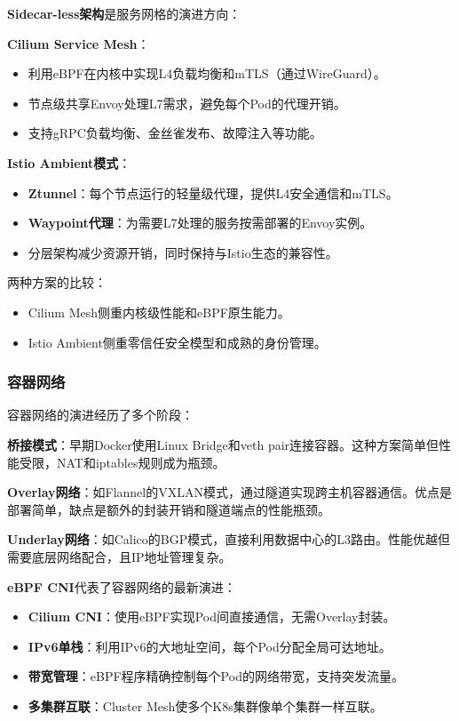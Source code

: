\textbf{Sidecar-less架构}是服务网格的演进方向：

\textbf{Cilium Service Mesh}：
\begin{itemize}
    \item 利用eBPF在内核中实现L4负载均衡和mTLS（通过WireGuard）。
    \item 节点级共享Envoy处理L7需求，避免每个Pod的代理开销。
    \item 支持gRPC负载均衡、金丝雀发布、故障注入等功能。
\end{itemize}

\textbf{Istio Ambient模式}：
\begin{itemize}
    \item \textbf{Ztunnel}：每个节点运行的轻量级代理，提供L4安全通信和mTLS。
    \item \textbf{Waypoint代理}：为需要L7处理的服务按需部署的Envoy实例。
    \item 分层架构减少资源开销，同时保持与Istio生态的兼容性。
\end{itemize}

两种方案的比较：
\begin{itemize}
    \item Cilium Mesh侧重内核级性能和eBPF原生能力。
    \item Istio Ambient侧重零信任安全模型和成熟的身份管理。
\end{itemize}

\subsubsection{容器网络}

容器网络的演进经历了多个阶段：

\textbf{桥接模式}：早期Docker使用Linux Bridge和veth pair连接容器。这种方案简单但性能受限，NAT和iptables规则成为瓶颈。

\textbf{Overlay网络}：如Flannel的VXLAN模式，通过隧道实现跨主机容器通信。优点是部署简单，缺点是额外的封装开销和隧道端点的性能瓶颈。

\textbf{Underlay网络}：如Calico的BGP模式，直接利用数据中心的L3路由。性能优越但需要底层网络配合，且IP地址管理复杂。

\textbf{eBPF CNI}代表了容器网络的最新演进：
\begin{itemize}
    \item \textbf{Cilium CNI}：使用eBPF实现Pod间直接通信，无需Overlay封装。
    \item \textbf{IPv6单栈}：利用IPv6的大地址空间，每个Pod分配全局可达地址。
    \item \textbf{带宽管理}：eBPF程序精确控制每个Pod的网络带宽，支持突发流量。
    \item \textbf{多集群互联}：Cluster Mesh使多个K8s集群像单个集群一样互联。
\end{itemize}

